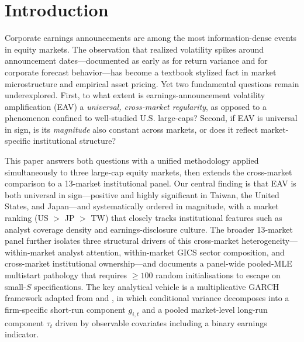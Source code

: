\documentclass[12pt,a4paper]{article}
\begin{document}
\begin{abstract}
\medskip
\noindent
\textbf{Keywords:} earnings announcements, volatility amplification, multiplicative
GARCH, cross-market regularity, pooled panel estimation, cluster bootstrap

\medskip
\noindent
\textbf{JEL Classification:} C23, C58, G12, G14, M41
\end{abstract}

\newpage

\section{Introduction}
\label{sec:intro}

Corporate earnings announcements are among the most information-dense events in
equity markets. The observation that realized volatility spikes around
announcement dates---documented as early as \citet{beaver1968} for return
variance and \citet{patell1976} for corporate forecast behavior---has become a
textbook stylized fact in market microstructure and empirical asset pricing.
Yet two fundamental questions remain underexplored. First, to what extent is
earnings-announcement volatility amplification (EAV) a \emph{universal,
cross-market regularity}, as opposed to a phenomenon confined to well-studied
U.S. large-caps? Second, if EAV is universal in sign, is its \emph{magnitude}
also constant across markets, or does it reflect market-specific institutional
structure?

This paper answers both questions with a unified methodology applied
simultaneously to three large-cap equity markets, then extends the cross-market
comparison to a 13-market institutional panel. Our central finding is that EAV
is both universal in sign---positive and highly significant in Taiwan, the
United States, and Japan---and systematically ordered in magnitude, with a
market ranking (US $>$ JP $>$ TW) that closely tracks institutional features
such as analyst coverage density and earnings-disclosure culture. The broader
13-market panel further isolates three structural drivers of this cross-market
heterogeneity---within-market analyst attention, within-market GICS sector
composition, and cross-market institutional ownership---and documents a
panel-wide pooled-MLE multistart pathology that requires $\geq 100$ random
initialisations to escape on small-$S$ specifications. The key analytical
vehicle is a multiplicative GARCH framework adapted from
\citet{engle_rangel2008} and \citet{engle2013}, in which conditional variance
decomposes into a firm-specific short-run component $g_{i,t}$ and a pooled
market-level long-run component $\tau_t$ driven by observable covariates
including a binary earnings indicator.
\end{document}
